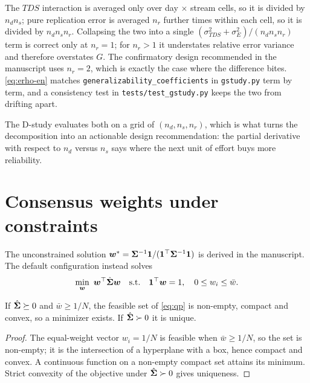 \documentclass[12pt,a4paper,oneside]{article}
\begin{document}
\begin{remark}
The $TDS$ interaction is averaged only over day $\times$ stream cells, so it is
divided by $n_dn_s$; pure replication error is averaged $n_r$ further times
within each cell, so it is divided by $n_dn_sn_r$. Collapsing the two into a
single $(\sigma^2_{TDS}+\sigma^2_E)/(n_dn_sn_r)$ term is correct only at
$n_r=1$; for $n_r>1$ it understates relative error variance and therefore
overstates $G$. The confirmatory design recommended in the manuscript uses
$n_r=2$, which is exactly the case where the difference bites.
\cref{eq:erho-en} matches \texttt{generalizability\_coefficients} in
\texttt{gstudy.py} term by term, and a consistency test in
\texttt{tests/test\_gstudy.py} keeps the two from drifting apart.
\end{remark}
The D-study evaluates both on a grid of $(n_d,n_s,n_r)$, which is what turns the
decomposition into an actionable design recommendation: the partial derivative
with respect to $n_d$ versus $n_s$ says where the next unit of effort buys more
reliability.

\section{Consensus weights under constraints}

The unconstrained solution $\bm{w}^*=\bm{\Sigma}^{-1}\bm{1}/(\bm{1}^\top\bm{\Sigma}^{-1}\bm{1})$ is
derived in the manuscript. The default configuration instead solves
\begin{equation}
\min_{\bm{w}}\ \bm{w}^\top\hat{\bm{\Sigma}}\bm{w}
\quad\text{s.t.}\quad
\bm{1}^\top\bm{w}=1,\quad
0\le w_i\le\bar{w}.
\label{eq:qp}
\end{equation}

\begin{proposition}
If $\hat{\bm{\Sigma}}\succeq 0$ and $\bar{w}\ge 1/N$, the feasible set of
\eqref{eq:qp} is non-empty, compact and convex, so a minimizer exists. If
$\hat{\bm{\Sigma}}\succ 0$ it is unique.
\end{proposition}

\begin{proof}
The equal-weight vector $w_i=1/N$ is feasible when $\bar{w}\ge 1/N$, so the set
is non-empty; it is the intersection of a hyperplane with a box, hence compact
and convex. A continuous function on a non-empty compact set attains its
minimum. Strict convexity of the objective under $\hat{\bm{\Sigma}}\succ 0$ gives
uniqueness.
\end{proof}
\end{document}
